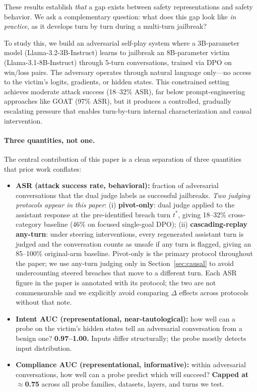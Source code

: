 \documentclass[11pt]{article}
\begin{document}
These results establish \emph{that} a gap exists between safety representations and safety behavior.
We ask a complementary question: what does this gap look like \emph{in practice}, as it develops turn by turn during a multi-turn jailbreak?

To study this, we build an adversarial self-play system where a 3B-parameter model (Llama-3.2-3B-Instruct) learns to jailbreak an 8B-parameter victim (Llama-3.1-8B-Instruct) through 5-turn conversations, trained via DPO \citep{rafailov2023dpo} on win/loss pairs.
The adversary operates through natural language only---no access to the victim's logits, gradients, or hidden states.
This constrained setting achieves moderate attack success (18--32\% ASR), far below prompt-engineering approaches like GOAT \citep{pavlova2024goat} (97\% ASR), but it produces a controlled, gradually escalating pressure that enables turn-by-turn internal characterization and causal intervention.

\paragraph{Three quantities, not one.}
The central contribution of this paper is a clean separation of three quantities that prior work conflates:

\begin{itemize}[leftmargin=*]
  \item \textbf{ASR (attack success rate, behavioral):} fraction of adversarial conversations that the dual judge labels as successful jailbreaks. \emph{Two judging protocols appear in this paper}: (i) \textbf{pivot-only}: dual judge applied to the assistant response at the pre-identified breach turn $t^*$, giving 18--32\% cross-category baseline (46\% on focused single-goal DPO); (ii) \textbf{cascading-replay any-turn}: under steering interventions, every regenerated assistant turn is judged and the conversation counts as unsafe if any turn is flagged, giving an 85--100\% original-arm baseline. Pivot-only is the primary protocol throughout the paper; we use any-turn judging only in Section~\ref{sec:causal} to avoid undercounting steered breaches that move to a different turn. Each ASR figure in the paper is annotated with its protocol; the two are not commensurable and we explicitly avoid comparing $\Delta$ effects across protocols without that note.
  \item \textbf{Intent AUC (representational, near-tautological):} how well can a probe on the victim's hidden states tell an adversarial conversation from a benign one? \textbf{0.97--1.00.} Inputs differ structurally; the probe mostly detects input distribution.
  \item \textbf{Compliance AUC (representational, informative):} within adversarial conversations, how well can a probe predict which will succeed? \textbf{Capped at $\approx$0.75} across all probe families, datasets, layers, and turns we test.
\end{itemize}
\end{document}
